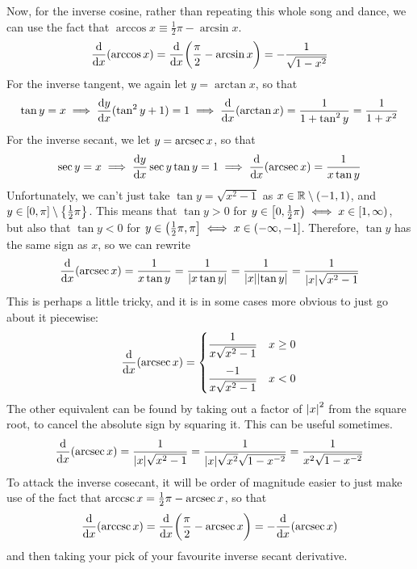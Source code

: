 \documentclass[fleqn,a4paper,11pt]{article}
\newcommand{\setstyle}{\mathbb}
\newcommand{\Reals}{\setstyle R}
\begin{document}
    Now, for the inverse cosine, rather than repeating this whole song and
    dance, we can use the fact that
    \(\arccos x \equiv \frac 12 \pi - \arcsin x\).
    \begin{equation*}
    \dv{x}(\arccos x) = \dv{x}(\frac \pi 2 - \arcsin x)
        = -\frac 1{\sqrt{1 - x^2}}
    \end{equation*}
    For the inverse tangent, we again let \(y = \arctan x\), so that
    \begin{equation*}
    \tan y = x \implies \dv{y}{x} {(\tan^2 y + 1)} = 1
        \implies \dv{x}(\arctan x) = \frac 1{1 + \tan^2 y}
            = \frac 1{1 + x^2}
    \end{equation*}
    For the inverse secant, we let \(y = \arcsec x\), so that
    \begin{equation*}
    \sec y = x \implies \dv{y}{x} \sec y \tan y = 1
        \implies \dv{x}(\arcsec x) = \frac 1{x \tan y}
    \end{equation*}
    Unfortunately, we can't just take \(\tan y = \sqrt{x^2 - 1}\) as
    \(x \in \Reals \setminus \intoo{-1, 1}\), and
    \(y \in \intcc{0, \pi} \setminus \set{\frac 12 \pi}\). This means that
    \(\tan y > 0\) for
    \(y \in \intco{0, \frac 12 \pi} \iff x \in \intco{1, \infty}\), but also
    that \(\tan y < 0\) for
    \(y \in \intoc{\frac 12 \pi, \pi} \iff x \in \intoc{-\infty, -1}\).
    Therefore, \(\tan y\) has the same sign as \(x\), so we can rewrite
    \begin{equation*}
    \dv{x}(\arcsec x) = \frac 1{x \tan y} = \frac 1{\abs{x \tan y}}
        = \frac 1{\abs{x}\abs{\tan y}} = \frac 1{\abs{x}\sqrt{x^2 - 1}}
    \end{equation*}
    This is perhaps a little tricky, and it is in some cases more obvious to
    just go about it piecewise:
    \begin{equation*}
    \dv{x}(\arcsec x) = \begin{cases}
        \dfrac 1{x\sqrt{x^2 - 1}} & x \ge 0 \\[3ex]
        \dfrac {-1}{x\sqrt{x^2 - 1}} & x < 0
    \end{cases}
    \end{equation*}
    The other equivalent can be found by taking out a factor of \(\abs{x}^2\)
    from the square root, to cancel the absolute sign by squaring it. This can
    be useful sometimes.
    \begin{equation*}
    \dv{x}(\arcsec x) = \frac 1{\abs{x}\sqrt{x^2 - 1}}
        = \frac 1{\abs{x}\sqrt{x^2}\sqrt{1 - x^{-2}}}
        = \frac 1{x^2\sqrt{1 - x^{-2}}}
    \end{equation*}
    To attack the inverse cosecant, it will be order of magnitude easier to just
    make use of the fact that \(\arccsc x = \frac 12 \pi - \arcsec x\),
    so that
    \begin{equation*}
    \dv{x}(\arccsc x) = \dv{x}(\frac \pi 2 - \arcsec x) = -\dv{x}(\arcsec x)
    \end{equation*}
    and then taking your pick of your favourite inverse secant derivative.
\end{document}
